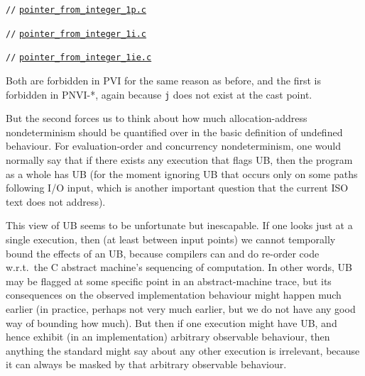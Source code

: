 \documentclass[acmsmall,review,screen]{acmart}\settopmatter{printfolios=true,printccs=false,printacmref=false}
\newcommand{\mytesturl}[1]{https://cerberus.cl.cam.ac.uk/cerberus?defacto/#1}
\newcommand{\mytestlink}[2]{\href{\mytesturl{#1}}{#2}}
\newcommand{\mylsttestlink}[1]{\mytestlink{#1}{\lstinline{#1}}}
\newcommand{\mylistingmargin}{5mm}
\newcommand{\myfooexample}[3]{{\vspace*{-0.5\baselineskip}\par{\noindent\small\hspace*{\mylistingmargin}\lstinline{//} \mylsttestlink{#2}\vspace*{0.25\baselineskip}\par}}}
\begin{document}
\begin{center}
  \begin{minipage}[t]{0.33\textwidth}
{\renewcommand{\mylistingmargin}{0mm}\myfooexample{charon_tests}{pointer_from_integer_1p.c}{}%
}
\vspace*{-0\baselineskip}
\end{minipage}
  \begin{minipage}[t]{0.33\textwidth}
    {\renewcommand{\mylistingmargin}{0mm}\myfooexample{charon_tests}{pointer_from_integer_1i.c}{}%
}
  \end{minipage}
  \begin{minipage}[t]{0.33\textwidth}
    {\renewcommand{\mylistingmargin}{0mm}\myfooexample{charon_tests}{pointer_from_integer_1ie.c}{}%
}
  \end{minipage}
  \end{center}
Both are forbidden in PVI for the same reason as before, and the first
is forbidden in PNVI-*, again because \lstinline{j} does not exist at the
cast point.  

But the second forces us to think about how much allocation-address
nondeterminism should be quantified over in the basic definition of
undefined behaviour. For evaluation-order and concurrency
nondeterminism, one would normally say that if there exists any execution
that flags UB, then the program as a whole has UB (for the moment
ignoring UB that occurs only on some paths following I/O input, which
is another important question that the current ISO text does not address).  

This view of UB seems to be unfortunate but inescapable. 
If one looks just at a single execution, then 
 (at least between input points) we cannot
temporally bound the effects of an UB, because compilers can and do
re-order code w.r.t.~the C abstract machine's sequencing of
computation.  In other words, UB may be flagged at some specific point
in an abstract-machine trace, but its consequences on the observed
implementation behaviour might happen much earlier (in practice,
perhaps not very much earlier, but we do not have any good way of
bounding how much).
%
But then if one execution might have UB, and hence exhibit (in an
implementation) arbitrary observable behaviour, then anything the
standard might say about any other execution is irrelevant, because it
can always be masked by that arbitrary observable behaviour.
\end{document}
